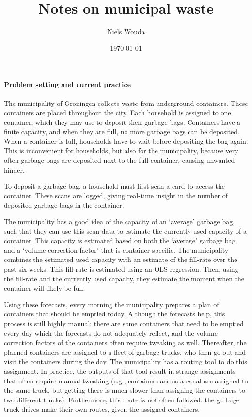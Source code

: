 \documentclass[a4paper, 12pt]{article}
\title{Notes on municipal waste}
\author{Niels Wouda}
\date{\today}
\begin{document}
    \maketitle

    \paragraph{Problem setting and current practice}
    The municipality of Groningen collects waste from underground containers.
    These containers are placed throughout the city.
    Each household is assigned to one container, which they may use to deposit their garbage bags.
    Containers have a finite capacity, and when they are full, no more garbage bags can be deposited.
    When a container is full, households have to wait before depositing the bag again.
    This is inconvenient for households, but also for the municipality, because very often garbage bags are deposited next to the full container, causing unwanted hinder.

    To deposit a garbage bag, a household must first scan a card to access the container.
    These scans are logged, giving real-time insight in the number of deposited garbage bags in the container.

    The municipality has a good idea of the capacity of an `average' garbage bag, such that they can use this scan data to estimate the currently used capacity of a container.
    This capacity is estimated based on both the `average' garbage bag, and a `volume correction factor' that is container-specific.
    The municipality combines the estimated used capacity with an estimate of the fill-rate over the past six weeks.
    This fill-rate is estimated using an OLS regression.
    Then, using the fill-rate and the currently used capacity, they estimate the moment when the container will likely be full.

    Using these forecasts, every morning the municipality prepares a plan of containers that should be emptied today.
    Although the forecasts help, this process is still highly manual: there are some containers that need to be emptied every day which the forecasts do not adequately reflect, and the volume correction factors of the containers often require tweaking as well.
    Thereafter, the planned containers are assigned to a fleet of garbage trucks, who then go out and visit the containers during the day.
    The municipality has a routing tool to do this assignment.
    In practice, the outputs of that tool result in strange assignments that often require manual tweaking (e.g., containers across a canal are assigned to the same truck, but getting there is much slower than assigning the containers to two different trucks).
    Furthermore, this route is not often followed: the garbage truck drives make their own routes, given the assigned containers.
\end{document}
